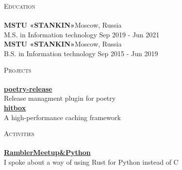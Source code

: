 \documentclass[a4paper]{article}
\newcommand{\lineunder} {
    \vspace*{-8pt} \\
    \hspace*{-18pt} \hrulefill \\
}
\newcommand{\header} [1] {
    {\hspace*{-18pt}\vspace*{6pt} \textsc{#1}}
    \vspace*{-6pt} \lineunder
}
\begin{document}
\header{Education}
\textbf{MSTU «STANKIN»}\hfill Moscow, Russia\\
M.S. in Information technology \hfill Sep 2019 - Jun 2021\\
\vspace{2mm}
\textbf{MSTU «STANKIN»}\hfill Moscow, Russia\\
B.S. in Information technology \hfill Sep 2015 - Jun 2019\\
\vspace{2mm}

\header{Projects}
{\textbf{\href{https://github.com/topenkoff/poetry-release}{poetry-release}}}\\
Release managment plugin for poetry\\

\vspace*{2mm}
{\textbf{\href{https://github.com/hit-box/hitbox}{hitbox}}}\\
A high-performance caching framework\\
\vspace*{2mm}

\header{Activities}
{\textbf{\href{https://www.youtube.com/watch?v=gpf_KOAmgzY&t=3040s}{RamblerMeetup\&Python}}}\\
I spoke about a way of using Rust for Python instead of C\\
\vspace*{2mm}

\
\end{document}

